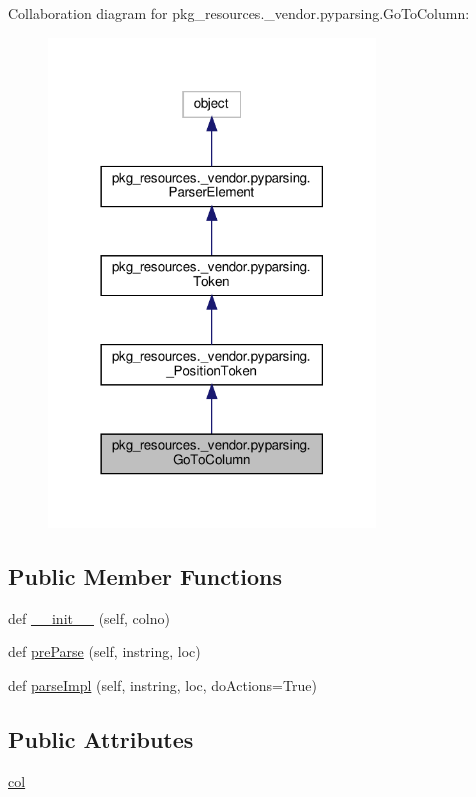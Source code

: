Collaboration diagram for pkg\+\_\+resources.\+\_\+vendor.\+pyparsing.\+Go\+To\+Column\+:
\nopagebreak
\begin{figure}[H]
\begin{center}
\leavevmode
\includegraphics[width=246pt]{classpkg__resources_1_1__vendor_1_1pyparsing_1_1GoToColumn__coll__graph}
\end{center}
\end{figure}
\subsection*{Public Member Functions}
\begin{DoxyCompactItemize}
\item 
def \hyperlink{classpkg__resources_1_1__vendor_1_1pyparsing_1_1GoToColumn_a314918f1005e4bfb6649a8001e6e820f}{\+\_\+\+\_\+init\+\_\+\+\_\+} (self, colno)
\item 
def \hyperlink{classpkg__resources_1_1__vendor_1_1pyparsing_1_1GoToColumn_abcd0917652e6776658421fed551615e6}{pre\+Parse} (self, instring, loc)
\item 
def \hyperlink{classpkg__resources_1_1__vendor_1_1pyparsing_1_1GoToColumn_ac8904fde06ff717d5332a65b4c390148}{parse\+Impl} (self, instring, loc, do\+Actions=True)
\end{DoxyCompactItemize}
\subsection*{Public Attributes}
\begin{DoxyCompactItemize}
\item 
\hyperlink{classpkg__resources_1_1__vendor_1_1pyparsing_1_1GoToColumn_ae9800213fb14132f231e388ed2a323e3}{col}
\end{DoxyCompactItemize}
